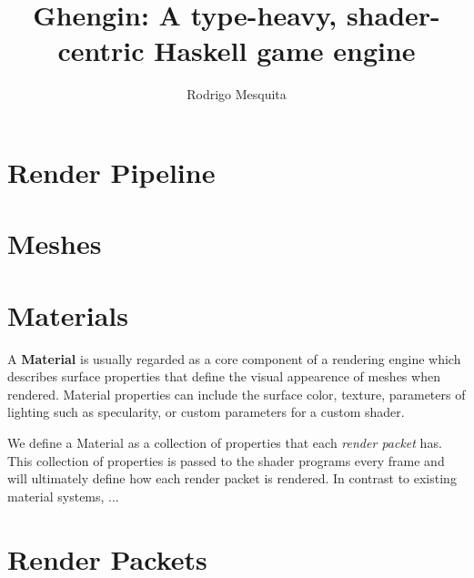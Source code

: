 \documentclass{article}
\title{Ghengin: A type-heavy, shader-centric Haskell game engine}
\author{Rodrigo Mesquita}
\begin{document}
\maketitle

\section{Render Pipeline}

\section{Meshes}

\section{Materials}

A \textbf{Material} is usually regarded as a core component of a rendering
engine which describes surface properties that define the visual appearence of
meshes when rendered. Material properties can include the surface color,
texture, parameters of lighting such as specularity, or custom parameters for a
custom shader.

We define a Material as a collection of properties that each \emph{render
packet} has. This collection of properties is passed to the shader programs
every frame and will ultimately define how each render packet is rendered. In
contrast to existing material systems, ...

\section{Render Packets}

\end{document}
